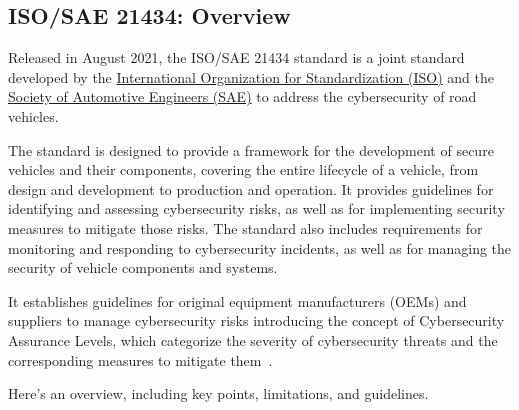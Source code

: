 \subsection{ISO/SAE 21434: Overview}\label{subsec:iso-sae-21434}

Released in August 2021, the ISO/SAE 21434 standard is a joint standard
developed by the \href{https://www.iso.org/home.html}{International Organization for Standardization (ISO)} and the
\href{https://www.sae.org/}{Society of Automotive Engineers (SAE)} to address the cybersecurity of road vehicles.

The standard is designed to provide a framework for the development of secure vehicles and their components,
covering the entire lifecycle of a vehicle, from design and development to production and operation.
It provides guidelines for identifying and assessing cybersecurity risks, as well as for implementing security measures to mitigate those risks.
The standard also includes requirements for monitoring and responding to cybersecurity incidents, as well as for managing the security of vehicle components and systems.

It establishes guidelines for original equipment manufacturers (OEMs) and suppliers to manage cybersecurity risks introducing the concept of Cybersecurity Assurance Levels,
which categorize the severity of cybersecurity threats and the corresponding measures to mitigate them~\cite{moukahal2021towards,iso-correlation}.

Here's an overview, including key points, limitations, and guidelines.

